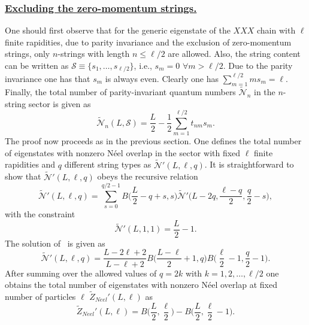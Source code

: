 \documentclass[11pt]{iopart}
\begin{document}
\subsubsection{\underline{Excluding the zero-momentum strings.}}
\label{app-1.2}

One should first observe that for the generic eigenstate of the $XXX$ chain with 
$\ell$ finite rapidities, due to parity invariance and the exclusion of zero-momentum 
strings, only $n$-strings with 
length $n\le \ell/2$ are allowed. Also, the string content can be written as 
${\mathcal S}\equiv\{s_1,\dots,s_{\ell/2}\}$, i.e., $s_m=0$ $\forall m>
\ell/2$. Due to the parity invariance one has that $s_m$ is always even. Clearly 
one has $\sum_{m=1}^{\ell/2}m s_m=\ell$. Finally, the total number of 
parity-invariant quantum numbers $\widetilde{\mathcal N}_n$ in the $n$-string 
sector is given as  
%
\begin{equation}
\widetilde{\mathcal N}_n(L,{\mathcal S})=\frac{L}{2}-\frac{1}{2}
\sum_{m=1}^{\ell/2}t_{nm} s_m.
\end{equation}
%
The proof now proceeds as in the previous section. One defines the total number of eigenstates 
with nonzero N\'eel overlap in the sector with fixed $\ell$ finite rapidities and $q$ different 
string types as $\widetilde{\mathcal N}'(L,\ell,q)$. It is straightforward to show that 
$\widetilde{\mathcal N}'(L,\ell,q)$ obeys the recursive relation
%
\begin{equation}
\label{NpLlq-1}
\widetilde{\mathcal N}'(L,\ell,q)=\sum_{s=0}^{q/2-1}B\Big(\frac{L}{2}-q+s,s\Big)\widetilde
{\mathcal N}'\Big(L-2q,\frac{\ell-q}{2},\frac{q}{2}-s\Big),
\end{equation}
% 
with the constraint
%
\begin{equation}
\widetilde{\mathcal N}'(L,1,1)=\frac{L}{2}-1. 
\end{equation}
%
The solution of~ is given as 
%
\begin{equation}
\widetilde{\mathcal N}'(L,\ell,q)=\frac{L-2\ell+2}{L-\ell+2}B\Big(\frac{L-\ell}{2}+1,q\Big)
B\Big(\frac{\ell}{2}-1,\frac{q}{2}-1\Big).
\end{equation}
%
After summing over the allowed values of $q=2k$ with $k=1,2,\dots,\ell/2$ one obtains 
the total number of eigenstates with nonzero N\'eel overlap at fixed number of 
particles $\ell$ $\widetilde Z_{Neel}'(L,\ell)$ as 
%
\begin{equation}
\label{Neel-fi}
\widetilde Z_{Neel}'(L,\ell)=B\Big(\frac{L}{2},\frac{\ell}{2}\Big)-
B\Big(\frac{L}{2},\frac{\ell}{2}-1\Big).
\end{equation}
\end{document}
